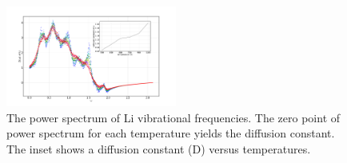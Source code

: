 \documentclass[twoside,twocolumn,9pt]{article}
\begin{document}
\begin{figure}
\centering
\includegraphics[width=0.5\textwidth]{Pics/powerSpectra.pdf}
\caption{The power spectrum of Li vibrational frequencies.
 The zero point of power spectrum for each temperature yields the diffusion constant.
 The inset shows a diffusion constant (D) versus temperatures.}
\label{fig:powerSpectra}
\end{figure}
\end{document}
